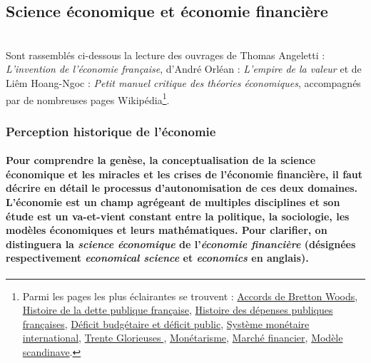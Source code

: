 \documentclass[11pt]{amsart}
\begin{document}
\newpage 

\subsection*{Science économique et économie financière}$ $\\

Sont rassemblés ci-dessous la lecture des ouvrages de Thomas Angeletti : \textsl{L'invention de l'économie française}, d'André Orléan : \textsl{L'empire de la valeur} et de Liêm Hoang-Ngoc : \textsl{Petit manuel critique des théories économiques}, accompagnés par de nombreuses pages Wikipédia\footnote{Parmi les pages les plus éclairantes se trouvent : \href{https://fr.wikipedia.org/wiki/Accords_de_Bretton_Woods}{Accords de Bretton Woods}, \href{https://fr.wikipedia.org/wiki/Histoire_de_la_dette_publique_française}{Histoire de la dette publique française}, \href{https://fr.wikipedia.org/wiki/Histoire_des_dépenses_publiques_françaises}{Histoire des dépenses publiques françaises}, \href{https://fr.wikipedia.org/wiki/Déficit_budgétaire_et_déficit_public}{Déficit budgétaire et déficit public}, \href{https://fr.wikipedia.org/wiki/Système_monétaire_international}{Système monétaire international}, \href{https://fr.wikipedia.org/wiki/Trente_Glorieuses}{Trente Glorieuses}, \href{https://fr.wikipedia.org/wiki/Monétarisme}{Monétarisme}, \href{https://fr.wikipedia.org/wiki/Marché_financier}{Marché financier}, \href{https://fr.wikipedia.org/wiki/Modèle_scandinave}{Modèle scandinave}.}. 

\subsubsection*{Perception historique de l'économie}

\paragraph{Pour comprendre la genèse, la conceptualisation de la science économique et les miracles et les crises de l'économie financière, il faut décrire en détail le processus d'autonomisation de ces deux domaines. L'économie est un champ agrégeant de multiples disciplines et son étude est un va-et-vient constant entre la politique, la sociologie, les modèles économiques et leurs mathématiques. Pour clarifier, on distinguera la \textit{science économique} de l'\textit{économie financière} (désignées respectivement \textit{economical science} et \textit{economics} en anglais).}
\end{document}
